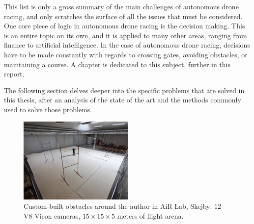 This list is only a gross summary of the main challenges of autonomous drone
racing, and only scratches the surface of all the issues that must be
considered. One core piece of logic in autonomous drone racing is the decision
making. This is an entire topic on its own, and it is applied to many other
areas, ranging from finance to artificial intelligence. In the case of
autonomous drone racing, decisions have to be made constantly with regards to
crossing gates, avoiding obstacles, or maintaining a course. A chapter is
dedicated to this subject, further in this report.

The following section delves deeper into the specific problems that are solved
in this thesis, after an analysis of the state of the art and the methods
commonly used to solve those problems.

\begin{figure}[h]
	\centering
	\includegraphics[width=0.5\textwidth]{figure/tiny_me.jpg}
	\caption[Custom-built obstacles around the author in AiR Lab]{Custom-built
		obstacles around the author in AiR Lab, Skejby: 12 V8 Vicon cameras,
		$15 \times 15 \times 5$ meters of flight arena.}
	\label{fig:mygates}
\end{figure}

